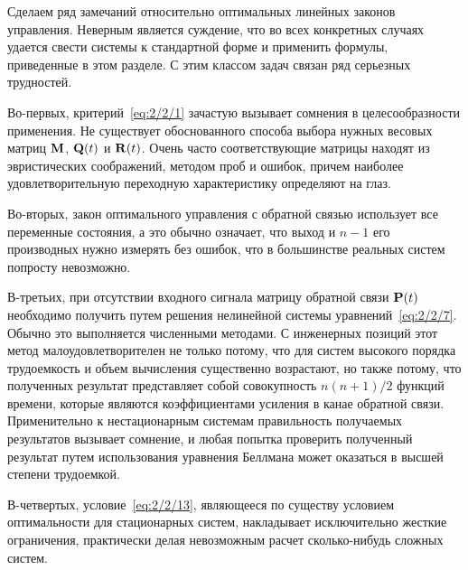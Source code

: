 Сделаем ряд замечаний относительно оптимальных линейных законов управления. Неверным является суждение, что во всех конкретных случаях удается свести системы к стандартной форме и применить формулы, приведенные в этом разделе. С этим классом задач связан ряд серьезных трудностей.

Во-первых, критерий~\vref{eq:2/2/1} зачастую вызывает сомнения в целесообразности применения. Не существует обоснованного способа выбора нужных весовых матриц $\mathbf{M}$, $\mathbf{Q}(t)$ и $\mathbf{R}(t)$. Очень часто соответствующие матрицы находят из эвристических соображений, методом проб и ошибок, причем наиболее удовлетворительную переходную характеристику определяют на глаз.

Во-вторых, закон оптимального управления с обратной связью использует все переменные состояния, а это обычно означает, что выход и $n-1$ его производных нужно измерять без ошибок, что в большинстве реальных систем попросту невозможно.

В-третьих, при отсутствии входного сигнала матрицу обратной связи $\mathbf{P}(t)$ необходимо получить путем решения нелинейной системы уравнений~\vref{eq:2/2/7}. Обычно это выполняется численными методами. С инженерных позиций этот метод малоудовлетворителен не только потому, что для систем высокого порядка трудоемкость и объем вычисления существенно возрастают, но также потому, что полученных результат представляет собой совокупность $n(n+1)/2$ функций времени, которые являются коэффициентами усиления в канае обратной связи. Применительно к нестационарным системам правильность получаемых результатов вызывает сомнение, и любая попытка проверить полученный результат путем использования уравнения Беллмана может оказаться в высшей степени трудоемкой.

В-четвертых, условие~\vref{eq:2/2/13}, являющееся по существу условием оптимальности для стационарных систем, накладывает исключительно жесткие ограничения, практически делая невозможным расчет сколько-нибудь сложных систем.
